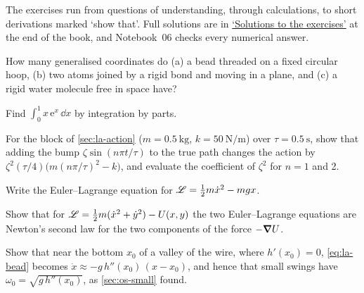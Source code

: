 \label{sec:la-exercises}

The exercises run from questions of understanding, through calculations,
to short derivations marked `show that'. Full solutions are in
\hyperref[sec:la-solutions]{`Solutions to the exercises'} at the end of
the book, and Notebook~06 checks every numerical answer.

\begin{exercise}
\label{ex:la-count}
How many generalised coordinates do (a) a bead threaded on a fixed
circular hoop, (b) two atoms joined by a rigid bond and moving in a plane,
and (c) a rigid water molecule free in space have?
\end{exercise}

\begin{exercise}[by parts]
\label{ex:la-parts}
Find $\int_0^1 x\,\mathrm{e}^x\,\dd x$ by integration by parts.
\end{exercise}

\begin{exercise}
\label{ex:la-saddle}
For the block of \cref{sec:la-action} ($m = \SI{0.5}{\kilogram}$, $k =
\SI{50}{\newton\per\metre}$) over $\tau = \SI{0.5}{\second}$, show that
adding the bump $\zeta\sin(n\pi t/\tau)$ to the true path changes the
action by $\zeta^2(\tau/4)\bigl(m(n\pi/\tau)^2 - k\bigr)$, and evaluate the
coefficient of $\zeta^2$ for $n = 1$ and 2.
\end{exercise}

\begin{exercise}
\label{ex:la-fall}
Write the Euler--Lagrange equation for $\mathscr{L} = \frac12 m\dot{x}^2 - mgx$.
\end{exercise}

\begin{exercise}
\label{ex:la-plane}
Show that for $\mathscr{L} = \frac12 m(\dot{x}^2 + \dot{y}^2) - U(x, y)$ the two
Euler--Lagrange equations are Newton's second law for the two components
of the force $-\bm{\nabla} U$.
\end{exercise}

\begin{exercise}
\label{ex:la-valley}
Show that near the bottom $x_0$ of a valley of the wire, where $h'(x_0) =
0$, \cref{eq:la-bead} becomes $\ddot{x} \approx -g\,h''(x_0)\,(x - x_0)$,
and hence that small swings have $\omega_0 = \sqrt{g\,h''(x_0)}$, as
\cref{sec:os-small} found.
\end{exercise}

